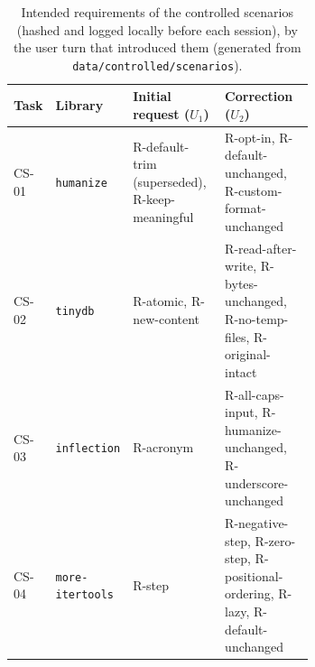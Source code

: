 \begin{table}[t]\centering\footnotesize
\caption{Intended requirements of the controlled scenarios (hashed and logged locally before each session), by the user turn that introduced them (generated from \texttt{data/controlled/scenarios}).}\label{tab:scenarios}
\begin{tabular}{llp{0.33\linewidth}p{0.33\linewidth}}\toprule Task & Library & Initial request ($U_1$) & Correction ($U_2$) \\\midrule
CS-01 & \texttt{humanize} & R-default-trim (superseded), R-keep-meaningful & R-opt-in, R-default-unchanged, R-custom-format-unchanged \\
CS-02 & \texttt{tinydb} & R-atomic, R-new-content & R-read-after-write, R-bytes-unchanged, R-no-temp-files, R-original-intact \\
CS-03 & \texttt{inflection} & R-acronym & R-all-caps-input, R-humanize-unchanged, R-underscore-unchanged \\
CS-04 & \texttt{more-itertools} & R-step & R-negative-step, R-zero-step, R-positional-ordering, R-lazy, R-default-unchanged \\
\bottomrule\end{tabular}\end{table}
